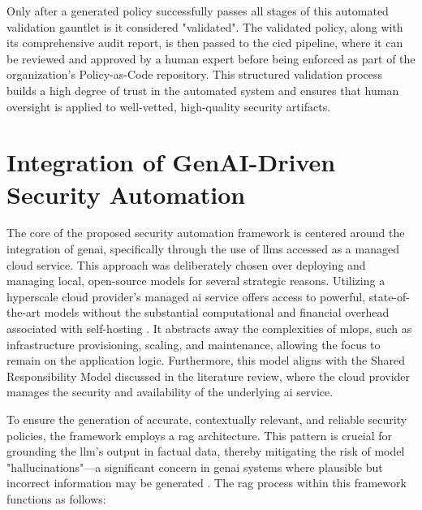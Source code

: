 Only after a generated policy successfully passes all stages of this automated validation gauntlet is it considered "validated". The validated policy, along with its comprehensive audit report, is then passed to the \gls{cicd} pipeline, where it can be reviewed and approved by a human expert before being enforced as part of the organization's Policy-as-Code repository. This structured validation process builds a high degree of trust in the automated system and ensures that human oversight is applied to well-vetted, high-quality security artifacts.



\section{Integration of GenAI-Driven Security Automation} %
\label{sub:Integration of GenAI-Driven Security Automation}

The core of the proposed security automation framework is centered around the integration of \gls{genai}, specifically through the use of \glspl{llm} accessed as a managed cloud service. This approach was deliberately chosen over deploying and managing local, open-source models for several strategic reasons. Utilizing a hyperscale cloud provider's managed \gls{ai} service offers access to powerful, state-of-the-art models without the substantial computational and financial overhead associated with self-hosting . It abstracts away the complexities of \gls{mlops}, such as infrastructure provisioning, scaling, and maintenance, allowing the focus to remain on the application logic. Furthermore, this model aligns with the Shared Responsibility Model discussed in the literature review, where the cloud provider manages the security and availability of the underlying \gls{ai} service.

To ensure the generation of accurate, contextually relevant, and reliable security policies, the framework employs a \gls{rag} architecture. This pattern is crucial for grounding the \gls{llm}'s output in factual data, thereby mitigating the risk of model "hallucinations"—a significant concern in \gls{genai} systems where plausible but incorrect information may be generated \cite{noauthor_ground_nodate}. The \gls{rag} process within this framework functions as follows:

